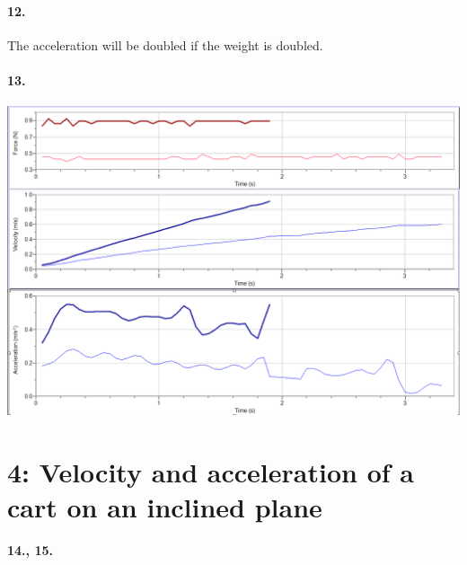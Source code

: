     \paragraph*{12.}

    \begin{mdframed}
        The acceleration will be doubled if the weight is doubled.
    \end{mdframed}

    \paragraph*{13.}

    \begin{mdframed}
        {\centering\includegraphics[width=\textwidth]{image6}}
    \end{mdframed}

    \section*{4: Velocity and acceleration of a cart on an inclined plane}

    \paragraph*{14., 15.}

